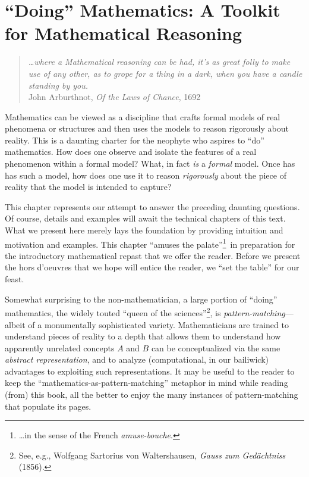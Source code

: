
\chapter{``Doing'' Mathematics:
A Toolkit for Mathematical Reasoning}
\label{ch:doingmath}


\begin{quote}
{\em \ldots where a Mathematical reasoning can be had, it's as great
  folly to make use of any other, as to grope for a thing in a dark,
  when you have a candle standing by you.} \\
\hspace*{2in} John Arburthnot, {\it Of the Laws of Chance}, 1692
\end{quote}

\noindent
Mathematics can be viewed as a discipline that crafts formal models of
real phenomena or structures and then uses the models to reason
rigorously about reality.  This is a daunting charter for the neophyte
who aspires to ``do'' mathematics.  How does one observe and isolate
the features of a real phenomenon within a formal model?  What, in
fact {\em is} a {\em formal} model.  Once has has such a model, how
does one use it to reason {\em rigorously} about the piece of reality
that the model is intended to capture?

This chapter represents our attempt to answer the preceding daunting
questions.  Of course, details and examples will await the technical
chapters of this text.  What we present here merely lays the
foundation by providing intuition and motivation and examples.  This
chapter ``amuses the palate''\footnote{\ldots in the sense of the
  French {\em amuse-bouche}.}~in preparation for the introductory
mathematical repast that we offer the reader.  Before we present the
hors d'oeuvres that we hope will entice the reader, we ``set the
table'' for our feast.


Somewhat surprising to the non-mathematician, a large portion of
``doing'' mathematics, the widely touted ``queen of the
sciences''\footnote{See, e.g., Wolfgang Sartorius von Waltershausen,
  {\it Gauss zum Ged\"{a}chtniss} (1856).}, is {\em
  pattern-matching}---albeit of a monumentally sophisticated variety.
Mathematicians are trained to understand pieces of reality to a depth
that allows them to understand how apparently unrelated concepts $A$
and $B$ can be conceptualized via the same {\em abstract
  representation}, and to analyze (computational, in our bailiwick)
advantages to exploiting such representations.  It may be useful to
the reader to keep the ``mathematics-as-pattern-matching'' metaphor in
mind while reading (from) this book, all the better to enjoy the many
instances of pattern-matching that populate its pages.

